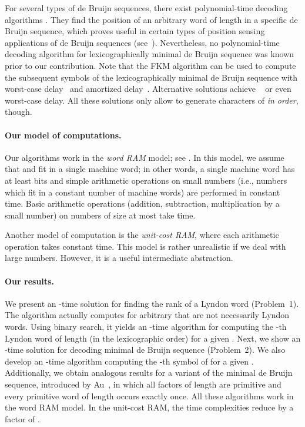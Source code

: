 \documentclass{article}
\theoremstyle{definition}
\theoremstyle{remark}
\begin{document}
For several types of de Bruijn sequences, there exist polynomial-time decoding algorithms \cite{DBLP:journals/tit/MitchellEP96,DBLP:journals/dm/Tuliani01}.
They find the position of an arbitrary word of length  in a specific de Bruijn sequence,
which proves useful in certain types of position sensing applications of de Bruijn sequences (see~\cite{DBLP:journals/dm/Tuliani01}).
Nevertheless, no polynomial-time decoding algorithm for lexicographically minimal de Bruijn sequence was known prior to our contribution.
Note that the FKM algorithm can be used to compute the subsequent symbols of the lexicographically minimal
de Bruijn sequence with worst-case  delay~\cite{FK} and amortized  delay~\cite{DBLP:journals/jal/RuskeySW92}.
Alternative solutions achieve ~\cite{DBLP:journals/jct/Fredricksen72,DBLP:journals/jal/Ralston81} or even ~\cite{JRmgr} worst-case delay.
All these solutions only allow to generate characters of  \emph{in order}, though.

\paragraph{\bf Our model of computations.}
Our algorithms work in the \emph{word RAM} model; see \cite{DBLP:conf/stacs/Hagerup98}.
In this model, we assume that  and  fit in a single machine word;
in other words, a single machine word has at least  bits and simple arithmetic operations on
small numbers (i.e., numbers which fit in a constant number of machine words) are performed in constant time.
Basic arithmetic operations (addition, subtraction, multiplication by a small number) on numbers of size at most  take  time.

Another model of computation is the \emph{unit-cost RAM}, where each arithmetic operation
takes constant time. This model is rather unrealistic if we deal with large numbers.
However, it is a useful intermediate abstraction.

\paragraph{\bf Our results.}
We present an -time solution for finding the rank of a Lyndon word
(Problem~1).
The algorithm actually computes  for arbitrary  that are not necessarily Lyndon words.
Using binary search, it yields an -time algorithm for computing
the -th Lyndon word of length  (in the lexicographic order) for a given .
Next, we show an -time solution for decoding minimal de Bruijn sequence  (Problem~2).
We also develop an -time algorithm computing the -th symbol of
 for a given .
Additionally, we obtain analogous results for a variant  of the minimal de Bruijn sequence, introduced by Au~\cite{DBLP:journals/dm/Au15},
in which all factors of length  are primitive and every primitive word of length  occurs exactly once.
All these algorithms work in the word RAM model.
In the unit-cost RAM, the time complexities reduce by a factor of .
\end{document}
